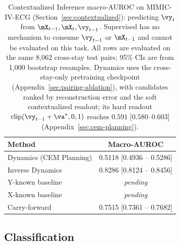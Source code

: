 \begin{table}[t]
\caption{Contextualized Inference macro-AUROC on MIMIC-IV-ECG (Section~\ref{sec:contextualized}): predicting $\vy_t$ from $\mX_{t-1}, \mX_t, \vy_{t-1}$. Supervised has no mechanism to consume $\vy_{t-1}$ or $\mX_{t-1}$ and cannot be evaluated on this task. All rows are evaluated on the same 8{,}062 cross-stay test pairs; 95\% CIs are from 1{,}000 bootstrap resamples. Dynamics uses the cross-stay-only pretraining checkpoint (Appendix~\ref{sec:pairing-ablation}), with candidates ranked by reconstruction error and the soft contextualized readout; its hard readout $\text{clip}(\vy_{t-1}+\va^\star,0,1)$ reaches $0.591$ $[0.580$--$0.603]$ (Appendix~\ref{sec:cem-planning}).}
\label{tab:contextualized}
\centering
\begin{tabular}{@{}l c@{}}
\toprule
\textbf{Method} & \textbf{Macro-AUROC} \\
\midrule
Dynamics (CEM Planning)   & 0.5118 \small{[0.4936 -- 0.5286]} \\
Inverse Dynamics          & 0.8286 \small{[0.8124 -- 0.8456]} \\
\addlinespace
Y-known baseline                   & \emph{pending} \\
X-known baseline                   & \emph{pending} \\
Carry-forward             & 0.7515 \small{[0.7361 -- 0.7682]} \\
\bottomrule
\end{tabular}
\end{table}


\subsection{Classification}
\label{sec:classification}

